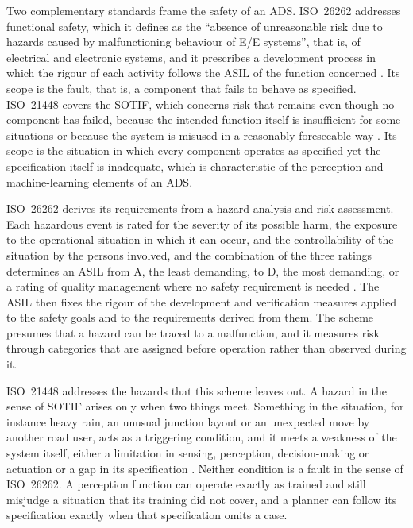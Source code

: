 Two complementary standards frame the safety of an \ac{ADS}. ISO~26262 addresses
functional safety, which it defines as the ``absence of unreasonable risk due to
hazards caused by malfunctioning behaviour of E/E systems'', that is, of electrical and electronic
systems, and it prescribes a development process in
which the rigour of each activity follows the \ac{ASIL} of the
function concerned \cite{iso26262}. Its scope is the fault, that is, a component that fails to behave as
specified. ISO~21448 covers the \ac{SOTIF}, which concerns risk that remains even
though no component has failed, because the intended function itself is insufficient
for some situations or because the system is misused in a reasonably foreseeable way
\cite{iso21448}. Its scope is the situation in which every component operates as
specified yet the specification itself is inadequate, which is characteristic of the
perception and machine-learning elements of an \ac{ADS}.

ISO~26262 derives its requirements from a hazard analysis and risk assessment. Each
hazardous event is rated for the severity of its possible harm, the exposure to the
operational situation in which it can occur, and the controllability of the situation
by the persons involved, and the combination of the three ratings determines an
\ac{ASIL} from A, the least demanding, to D, the most demanding, or a rating of
quality management where no safety requirement is needed \cite{iso26262}. The
\ac{ASIL} then fixes the rigour of the development and verification measures applied
to the safety goals and to the requirements derived from them. The scheme presumes
that a hazard can be traced to a malfunction, and it measures risk through
categories that are assigned before operation rather than observed during it.

ISO~21448 addresses the hazards that this scheme leaves out. A hazard in the sense of
\ac{SOTIF} arises only when two things meet. Something in the situation, for instance
heavy rain, an unusual junction layout or an unexpected move by another road user,
acts as a triggering condition, and it meets a weakness of the system itself, either a
limitation in sensing, perception, decision-making or actuation or a gap in its
specification \cite{iso21448} \cite{wang2024sotif}. Neither condition is a fault in
the sense of ISO~26262. A perception function can operate exactly as trained and
still misjudge a situation that its training did not cover, and a planner can follow
its specification exactly when that specification omits a case.

